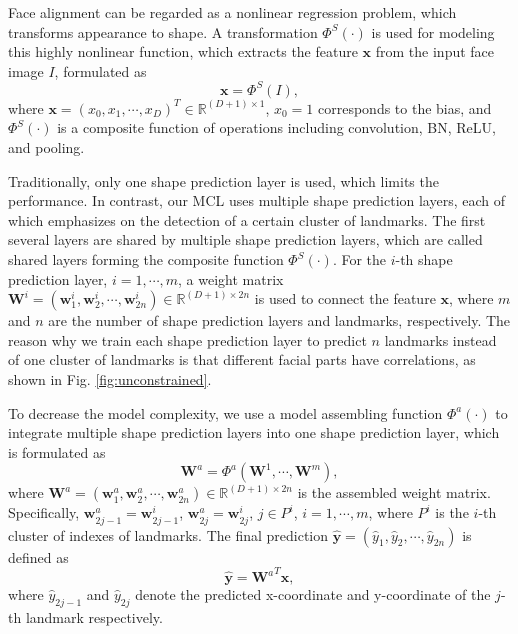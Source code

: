 \documentclass[journal]{IEEEtran}
\begin{document}
Face alignment can be regarded as a nonlinear regression problem, which transforms appearance to shape. A transformation $\Phi^S(\cdot)$ is used for modeling this highly nonlinear function, which extracts the feature $\mathbf{x}$ from the input face image $I$, formulated as
\begin{equation}
\mathbf{x}=\Phi^S(I),
\end{equation}
where $\mathbf{x}=(x_0,x_1,\cdots,x_{D})^T\in \mathbb{R}^{(D+1)\times 1}$, $x_0=1$ corresponds to the bias, and $\Phi^S(\cdot)$ is a composite function of operations including convolution, BN, ReLU, and pooling.

Traditionally, only one shape prediction layer is used, which limits the performance. In contrast, our MCL uses multiple shape prediction layers, each of which emphasizes on the detection of a certain cluster of landmarks. The first several layers are shared by multiple shape prediction layers, which are called shared layers forming the composite function $\Phi^S(\cdot)$.
For the $i$-th shape prediction layer, $i=1,\cdots,m$, a weight matrix $\mathbf{W}^{i}=(\mathbf{w}^{i}_1,\mathbf{w}^{i}_2,\cdots,\mathbf{w}^{i}_{2n})\in \mathbb{R}^{(D+1)\times 2n}$ is used to connect the feature $\mathbf{x}$,  where $m$ and $n$ are the number of shape prediction layers and landmarks, respectively. The reason why we train each shape prediction layer to predict $n$ landmarks instead of one cluster of landmarks is that different facial parts have correlations, as shown in Fig. \ref{fig:unconstrained}.

To decrease the model complexity, we use a model assembling function $\Phi^a(\cdot)$ to integrate multiple shape prediction layers into one shape prediction layer, which is formulated as
\begin{equation}
\label{eq:assemble}
\mathbf{W}^{a}=\Phi^a(\mathbf{W}^{1},\cdots,\mathbf{W}^{m}),
\end{equation}
where $\mathbf{W}^{a}=(\mathbf{w}^{a}_1,\mathbf{w}^{a}_2,\cdots,\mathbf{w}^{a}_{2n})\in \mathbb{R}^{(D+1)\times 2n}$ is the assembled weight matrix. Specifically, $\mathbf{w}^{a}_{2j-1}=\mathbf{w}^{i}_{2j-1}$, $\mathbf{w}^{a}_{2j}=\mathbf{w}^{i}_{2j}$, $j\in P^{i}$, $i=1,\cdots,m$, where $P^{i}$ is the $i$-th cluster of indexes of landmarks. The final prediction $\hat{\mathbf{y}}=(\hat{y}_1,\hat{y}_2,\cdots,\hat{y}_{2n})$ is defined as
\begin{equation}
\label{eq:final_pred}
\hat{\mathbf{y}}={\mathbf{W}^a}^T \mathbf{x},
\end{equation}
where $\hat{y}_{2j-1}$ and $\hat{y}_{2j}$ denote the predicted x-coordinate and y-coordinate of the $j$-th landmark respectively.
\end{document}
